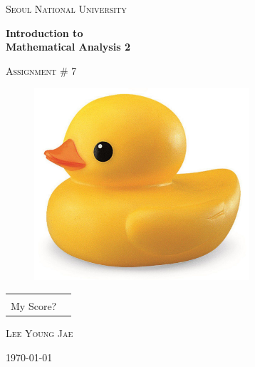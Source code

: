 \documentclass{article}
\begin{document}
\begin{titlepage}
\centering
{\scshape\LARGE Seoul National University \par}
\vspace{1.5cm}
{\huge\bfseries Introduction to\\Mathematical Analysis 2\par}
\vspace{1cm}
{\scshape\Large Assignment \# 7\par}

\vspace{1cm}

\begin{figure}[ht!]
\centering
\includegraphics[width=80mm]{rubberduck.jpg}
\end{figure}

\vspace{1cm}

\arrayrulewidth=1.2pt
\begin{tabular}{p{2.5cm}p{2cm}}
\centering
& \\
\cline{2-2}
\vspace{-.73cm}
My Score? & \\
\end{tabular}



\vfill
{}
\vspace{.7cm}\par
\textsc{\large Lee Young Jae}
\vspace{.7cm}\par
{\Large \today\par}
\end{titlepage}

\setlength{\parindent}{0cm}
\end{document}
